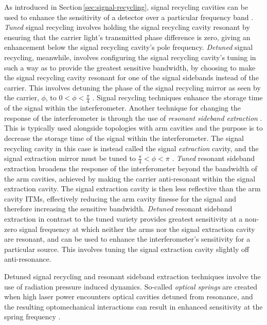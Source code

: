 As introduced in Section\,\ref{sec:signal-recycling}, signal recycling cavities can be used to enhance the sensitivity of a detector over a particular frequency band \cite{Hild2006}. \emph{Tuned} signal recycling involves holding the signal recycling cavity resonant by ensuring that the carrier light's transmitted phase difference is zero, giving an enhancement below the signal recycling cavity's pole frequency. \emph{Detuned} signal recycling, meanwhile, involves configuring the signal recycling cavity's tuning in such a way as to provide the greatest sensitive bandwidth, by choosing to make the signal recycling cavity resonant for one of the signal sidebands instead of the carrier. This involves detuning the phase of the signal recycling mirror as seen by the carrier, $\phi$, to $0 < \phi < \frac{\pi}{4}$ \cite{Somiya2005}. Signal recycling techniques enhance the storage time of the signal within the interferometer. Another technique for changing the response of the interferometer is through the use of \emph{resonant sideband extraction} \cite{Mason2003}. This is typically used alongside topologies with arm cavities and the purpose is to decrease the storage time of the signal within the interferometer. The signal recycling cavity in this case is instead called the signal \emph{extraction} cavity, and the signal extraction mirror must be tuned to $\frac{\pi}{4} < \phi < \pi$ \cite{Somiya2005}. \emph{Tuned} resonant sideband extraction broadens the response of the interferometer beyond the bandwidth of the arm cavities, achieved by making the carrier anti-resonant within the signal extraction cavity. The signal extraction cavity is then less reflective than the arm cavity \glspl{ITM}, effectively reducing the arm cavity finesse for the signal and therefore increasing the sensitive bandwidth. \emph{Detuned} resonant sideband extraction in contrast to the tuned variety provides greatest sensitivity at a non-zero signal frequency at which neither the arms nor the signal extraction cavity are resonant, and can be used to enhance the interferometer's sensitivity for a particular source. This involves tuning the signal extraction cavity slightly off anti-resonance.

Detuned signal recycling and resonant sideband extraction techniques involve the use of radiation pressure induced dynamics. So-called \emph{optical springs} are created when high laser power encounters optical cavities detuned from resonance, and the resulting optomechanical interactions can result in enhanced sensitivity at the spring frequency \cite{Buonanno2002}.

